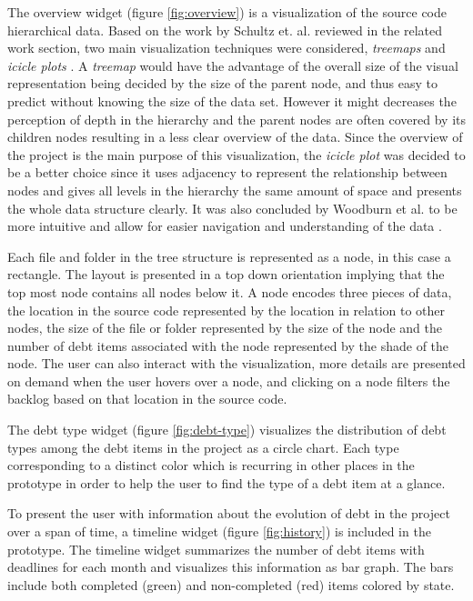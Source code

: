 The overview widget (figure \ref{fig:overview}) is a visualization of the source code hierarchical data.
Based on the work by Schultz et. al. reviewed in the related work section, two main visualization techniques were considered, \textit{treemaps} and \textit{icicle plots} \cite{schulz_design_2011}.
A \textit{treemap} would have the advantage of the overall size of the visual representation being decided by the size of the parent node, and thus easy to predict without knowing the size of the data set.
However it might decreases the perception of depth in the hierarchy and the parent nodes are often covered by its children nodes resulting in a less clear overview of the data.
Since the overview of the project is the main purpose of this visualization, the \textit{icicle plot} was decided to be a better choice since it uses adjacency to represent the relationship between nodes and gives all levels in the hierarchy the same amount of space and presents the whole data structure clearly.
It was also concluded by Woodburn et al. to be more intuitive and allow for easier navigation and understanding of the data \cite{woodburn_interactive_2019}.

Each file and folder in the tree structure is represented as a node, in this case a rectangle.
The layout is presented in a top down orientation implying that the top most node contains all nodes below it.
A node encodes three pieces of data, the location in the source code represented by the location in relation to other nodes, the size of the file or folder represented by the size of the node and the number of debt items associated with the node represented by the shade of the node.
The user can also interact with the visualization, more details are presented on demand when the user hovers over a node, and clicking on a node filters the backlog based on that location in the source code.



The debt type widget (figure \ref{fig:debt-type}) visualizes the distribution of debt types among the debt items in the project as a circle chart.
Each type corresponding to a distinct color which is recurring in other places in the prototype in order to help the user to find the type of a debt item at a glance.



To present the user with information about the evolution of debt in the project over a span of time, a timeline widget (figure \ref{fig:history}) is included in the prototype.
The timeline widget summarizes the number of debt items with deadlines for each month and visualizes this information as bar graph.
The bars include both completed (green) and non-completed (red) items colored by state.

